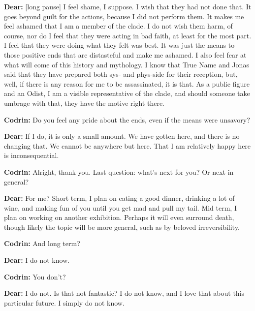 \textbf{Dear:} {[}long pause{]} I feel shame, I suppose. I wish that they had not done that. It goes beyond guilt for the actions, because I did not perform them. It makes me feel ashamed that I am a member of the clade. I do not wish them harm, of course, nor do I feel that they were acting in bad faith, at least for the most part. I feel that they were doing what they felt was best. It was just the means to those positive ends that are distasteful and make me ashamed. I also feel fear at what will come of this history and mythology. I know that True Name and Jonas said that they have prepared both sys- and phys-side for their reception, but, well, if there is any reason for me to be assassinated, it is that. As a public figure and an Odist, I am a visible representative of the clade, and should someone take umbrage with that, they have the motive right there.

\textbf{Codrin:} Do you feel any pride about the ends, even if the means were unsavory?

\textbf{Dear:} If I do, it is only a small amount. We have gotten here, and there is no changing that. We cannot be anywhere but here. That I am relatively happy here is inconsequential.

\textbf{Codrin:} Alright, thank you. Last question: what's next for you? Or next in general?

\textbf{Dear:} For me? Short term, I plan on eating a good dinner, drinking a lot of wine, and making fun of you until you get mad and pull my tail. Mid term, I plan on working on another exhibition. Perhaps it will even surround death, though likely the topic will be more general, such as by beloved irreversibility.

\textbf{Codrin:} And long term?

\textbf{Dear:} I do not know.

\textbf{Codrin:} You don't?

\textbf{Dear:} I do not. Is that not fantastic? I do not know, and I love that about this particular future. I simply do not know.
